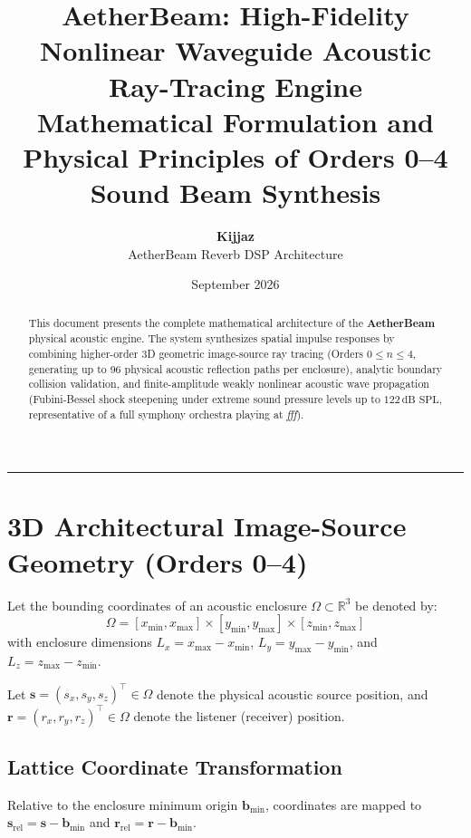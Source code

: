 \documentclass[11pt,a4paper]{article}
\title{\textbf{AetherBeam: High-Fidelity Nonlinear Waveguide Acoustic Ray-Tracing Engine}\\
\large Mathematical Formulation and Physical Principles of Orders 0--4 Sound Beam Synthesis}
\author{\textbf{Kijjaz} \\ AetherBeam Reverb DSP Architecture}
\date{September 2026}
\begin{document}
\maketitle

\begin{abstract}
This document presents the complete mathematical architecture of the \textbf{AetherBeam} physical acoustic engine. The system synthesizes spatial impulse responses by combining higher-order 3D geometric image-source ray tracing (Orders $0 \le n \le 4$, generating up to 96 physical acoustic reflection paths per enclosure), analytic boundary collision validation, and finite-amplitude weakly nonlinear acoustic wave propagation (Fubini-Bessel shock steepening under extreme sound pressure levels up to $122\,\text{dB SPL}$, representative of a full symphony orchestra playing at \textit{fff}).
\end{abstract}

\tableofcontents
\vspace{1em}
\hrule
\vspace{1.5em}

\section{3D Architectural Image-Source Geometry (Orders 0--4)}

Let the bounding coordinates of an acoustic enclosure $\Omega \subset \mathbb{R}^3$ be denoted by:
\begin{equation}
\Omega = [x_{\min}, x_{\max}] \times [y_{\min}, y_{\max}] \times [z_{\min}, z_{\max}]
\end{equation}
with enclosure dimensions $L_x = x_{\max} - x_{\min}$, $L_y = y_{\max} - y_{\min}$, and $L_z = z_{\max} - z_{\min}$.

Let $\mathbf{s} = (s_x, s_y, s_z)^\top \in \Omega$ denote the physical acoustic source position, and $\mathbf{r} = (r_x, r_y, r_z)^\top \in \Omega$ denote the listener (receiver) position.

\subsection{Lattice Coordinate Transformation}
Relative to the enclosure minimum origin $\mathbf{b}_{\min}$, coordinates are mapped to $\mathbf{s}_{\text{rel}} = \mathbf{s} - \mathbf{b}_{\min}$ and $\mathbf{r}_{\text{rel}} = \mathbf{r} - \mathbf{b}_{\min}$.
\end{document}
